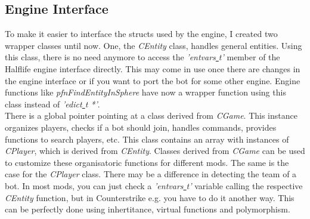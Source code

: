 \documentclass[12pt]{article}
\begin{document}
\subsection{Engine Interface}

To make it easier to interface the structs used by the engine, I created two wrapper classes until now. One, the \textit{CEntity} class, handles general entities. Using this class, there is no need anymore to access the \textit{'entvars\underline{ }t'} member of the Halflife engine interface directly. This may come in use once there are changes in the engine interface or if you want to port the bot for some other engine. Engine functions like \textit{pfnFindEntityInSphere} have now a wrapper function using this class instead of \textit{'edict\underline{ }t *'}.\\
There is a global pointer pointing at a class derived from \textit{CGame}. This instance organizes players, checks if a bot should join, handles commands, provides functions to search players, etc. This class contains an array with instances of \textit{CPlayer}, which is derived from \textit{CEntity}. Classes derived from \textit{CGame} can be used to customize these organisatoric functions for different mods. The same is the case for the \textit{CPlayer} class. There may be a difference in detecting the team of a bot. In most mods, you can just check a \textit{'entvars\underline{ }t'} variable calling the respective \textit{CEntity} function, but in Counterstrike e.g. you have to do it another way. This can be perfectly done using inhertitance, virtual functions and polymorphism.
\end{document}
